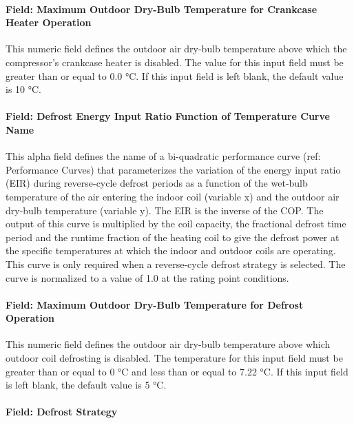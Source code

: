 \paragraph{Field: Maximum Outdoor Dry-Bulb Temperature for Crankcase Heater Operation}\label{field-maximum-outdoor-dry-bulb-temperature-for-crankcase-heater-operation-5}

This numeric field defines the outdoor air dry-bulb temperature above which the compressor's crankcase heater is disabled. The value for this input field must be greater than or equal to 0.0 °C. If this input field is left blank, the default value is 10 °C.

\paragraph{Field: Defrost Energy Input Ratio Function of Temperature Curve Name}\label{field-defrost-energy-input-ratio-function-of-temperature-curve-name-1}

This alpha field defines the name of a bi-quadratic performance curve (ref: Performance Curves) that parameterizes the variation of the energy input ratio (EIR) during reverse-cycle defrost periods as a function of the wet-bulb temperature of the air entering the indoor coil (variable x) and the outdoor air dry-bulb temperature (variable y). The EIR is the inverse of the COP. The output of this curve is multiplied by the coil capacity, the fractional defrost time period and the runtime fraction of the heating coil to give the defrost power at the specific temperatures at which the indoor and outdoor coils are operating. This curve is only required when a reverse-cycle defrost strategy is selected. The curve is normalized to a value of 1.0 at the rating point conditions.

\paragraph{Field: Maximum Outdoor Dry-Bulb Temperature for Defrost Operation}\label{field-maximum-outdoor-dry-bulb-temperature-for-defrost-operation-1}

This numeric field defines the outdoor air dry-bulb temperature above which outdoor coil defrosting is disabled. The temperature for this input field must be greater than or equal to 0 °C and less than or equal to 7.22 °C. If this input field is left blank, the default value is 5 °C.

\paragraph{Field: Defrost Strategy}\label{field-defrost-strategy-1}

